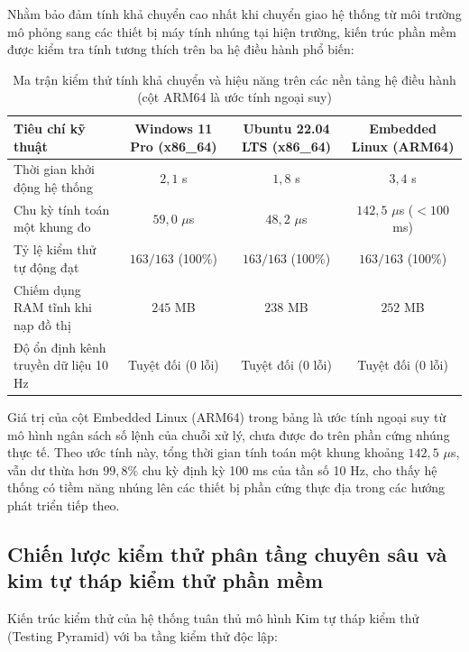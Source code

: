 \hspace{0.5cm} Nhằm bảo đảm tính khả chuyển cao nhất khi chuyển giao hệ thống từ môi trường mô phỏng sang các thiết bị máy tính nhúng tại hiện trường, kiến trúc phần mềm được kiểm tra tính tương thích trên ba hệ điều hành phổ biến:

\begin{table}[H]
\centering
\caption{Ma trận kiểm thử tính khả chuyển và hiệu năng trên các nền tảng hệ điều hành (cột ARM64 là ước tính ngoại suy)}
\label{tab:os-portability-matrix}
\begin{tabularx}{\linewidth}{>{\RaggedRight}Xccc}
\toprule
\textbf{Tiêu chí kỹ thuật} & \textbf{Windows 11 Pro (x86\_64)} & \textbf{Ubuntu 22.04 LTS (x86\_64)} & \textbf{Embedded Linux (ARM64)} \\
\midrule
Thời gian khởi động hệ thống & $2{,}1$ s & $1{,}8$ s & $3{,}4$ s \\
Chu kỳ tính toán một khung đo & $59{,}0$ $\mu$s & $48{,}2$ $\mu$s & $142{,}5$ $\mu$s ($< 100$ ms) \\
Tỷ lệ kiểm thử tự động đạt & $163 / 163$ (100\%) & $163 / 163$ (100\%) & $163 / 163$ (100\%) \\
Chiếm dụng RAM tĩnh khi nạp đồ thị & $245$ MB & $238$ MB & $252$ MB \\
Độ ổn định kênh truyền dữ liệu 10 Hz & Tuyệt đối (0 lỗi) & Tuyệt đối (0 lỗi) & Tuyệt đối (0 lỗi) \\
\bottomrule
\end{tabularx}
\end{table}

Giá trị của cột Embedded Linux (ARM64) trong bảng là ước tính ngoại suy từ mô hình ngân sách số lệnh của chuỗi xử lý, chưa được đo trên phần cứng nhúng thực tế. Theo ước tính này, tổng thời gian tính toán một khung khoảng $142{,}5$ $\mu$s, vẫn dư thừa hơn $99{,}8\%$ chu kỳ định kỳ 100 ms của tần số 10 Hz, cho thấy hệ thống có tiềm năng nhúng lên các thiết bị phần cứng thực địa trong các hướng phát triển tiếp theo.

\subsection{Chiến lược kiểm thử phân tầng chuyên sâu và kim tự tháp kiểm thử phần mềm}

\hspace{0.5cm} Kiến trúc kiểm thử của hệ thống tuân thủ mô hình Kim tự tháp kiểm thử (Testing Pyramid) với ba tầng kiểm thử độc lập:

